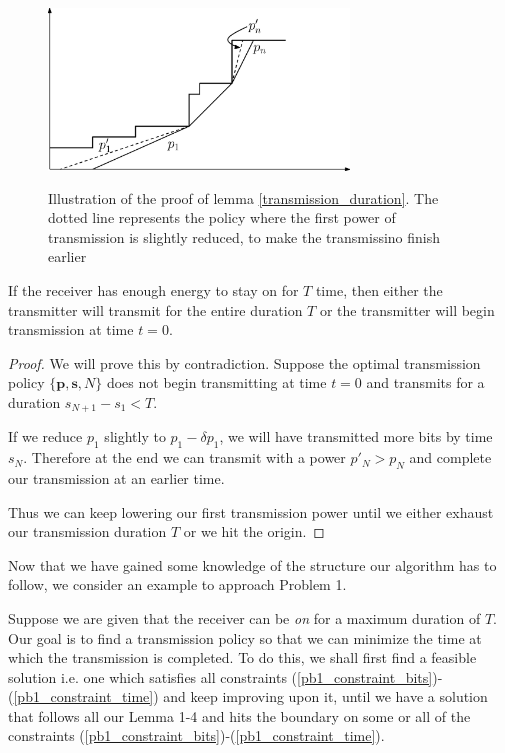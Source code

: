 
\begin{figure}
\label{lemma4}
\centering
  \centerline{\includegraphics[width=8cm,height=50mm]{Lemma4.eps}}
\caption{Illustration of the proof of lemma \ref{transmission_duration}. The dotted line represents the policy where the first power of transmission is slightly reduced, to make the transmissino finish earlier}
\end{figure}

\begin{lemma}
If the receiver has enough energy to stay on for $T$ time, then either the transmitter will transmit for the entire duration $T$ or the transmitter will begin transmission at time $t=0$.
\label{transmission_duration}
\end{lemma}
\begin{proof}
We will prove this by contradiction. Suppose the optimal transmission policy $\{\textbf{p},\textbf{s},N\}$ does not begin transmitting at time $t=0$ and transmits for a duration $s_{N+1}-s_1 < T$.

If we reduce $p_1$ slightly to $p_1-\delta p_1$, we will have transmitted more bits by time $s_N$. Therefore at the end we can transmit with a power $p'_N > p_N$ and complete our transmission at an earlier time.

Thus we can keep lowering our first transmission power until we either exhaust our transmission duration $T$ or we hit the origin.
\end{proof}

Now that we have gained some knowledge of the structure our algorithm has to follow, we consider an example to approach Problem 1. 

Suppose we are given that the receiver can be \textit{on} for a maximum duration of $T$. Our goal is to find a transmission policy so that we can minimize the time at which the transmission is completed. To do this, we shall first find a feasible solution i.e. one which satisfies all constraints (\ref{pb1_constraint_bits})-(\ref{pb1_constraint_time}) and keep improving upon it, until we have a solution that follows all our Lemma 1-4 and hits the boundary on some or all of the constraints (\ref{pb1_constraint_bits})-(\ref{pb1_constraint_time}). 

